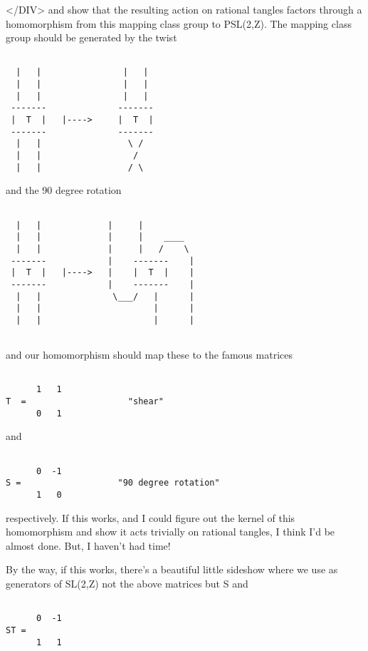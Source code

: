 </DIV>
and show that the resulting action on rational tangles factors
through a homomorphism from this mapping class group to PSL(2,Z).
The mapping class group should be generated by the twist 


\begin{verbatim}

  |   |                |   |
  |   |                |   |
  |   |                |   |
 -------              -------
 |  T  |   |---->     |  T  |        
 -------              -------
  |   |                 \ /
  |   |                  / 
  |   |                 / \
\end{verbatim}
    
and the 90 degree rotation


\begin{verbatim}

  |   |             |     |     
  |   |             |     |    ____
  |   |             |     |   /    \
 -------            |    -------    |
 |  T  |   |---->   |    |  T  |    |    
 -------            |    -------    |
  |   |              \___/   |      |
  |   |                      |      |
  |   |                      |      |
   
\end{verbatim}
    
and our homomorphism should map these to the famous matrices


\begin{verbatim}

      1   1             
T  =                    "shear"
      0   1
\end{verbatim}
    
and 


\begin{verbatim}

      0  -1          
S =                   "90 degree rotation"
      1   0
\end{verbatim}
    
respectively.   If this works, and I could figure out the kernel of 
this homomorphism and show it acts trivially on rational tangles, 
I think I'd be almost done.  But, I haven't had time!

By the way, if this works, there's a beautiful little sideshow where 
we use as generators of SL(2,Z) not the above matrices but S and 


\begin{verbatim}

      0  -1
ST = 
      1   1
\end{verbatim}
    

